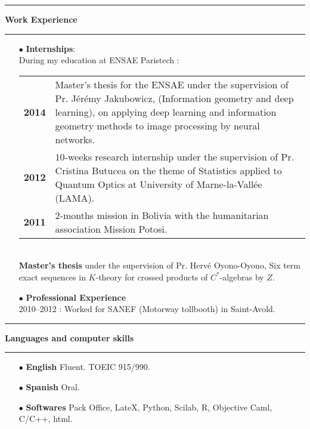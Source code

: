 \documentclass[a4paper,11pt]{article}
\newcommand{\titre}[1]{%
	\begin{center}
	\bigskip
	\rule{\textwidth}{1pt}
	\par\vspace{0.1cm}
        \textbf{\large #1}
	\par\rule{\textwidth}{1pt}
	\end{center}
	\bigskip
	}
\begin{document}
\titre{Work Experience}

\begin{itemize}
\medskip
\item[$\bullet$] \textbf{Internships}: \\

During my education at ENSAE Paristech : \\

\begin{tabular}{cp{}}
\textbf{2014} & Master's thesis for the ENSAE under the supervision of Pr. Jérémy Jakubowicz, (Information geometry and deep learning), on applying deep learning and information geometry methods to image processing by neural networks.\\
\textbf{2012}&  $10$-weeks research internship under the supervision of Pr. Cristina Butucea on the theme of Statistics applied to Quantum Optics at University of Marne-la-Vallée (LAMA).		\\
\textbf{2011} & $2$-months mission in Bolivia with the humanitarian association Mission Potosi.\\
\end{tabular}
\\

\textbf{Master's thesis} under the supervision of Pr. Hervé Oyono-Oyono, Six term exact sequences in $K$-theory for crossed products of $C^*$-algebras by $Z$.

\medskip

\item[$\bullet$] \textbf{Professional Experience}\\ 2010--2012 : Worked for SANEF (Motorway tollbooth) in Saint-Avold.\\

\medskip
\end{itemize}

\newpage

\titre{Languages and computer skills}

\begin{itemize} 
\medskip
\item[$\bullet$] \textbf{English} Fluent. TOEIC 915/990.
\medskip
\item[$\bullet$] \textbf{Spanish} Oral.
\medskip
\item[$\bullet$] \textbf{Softwares} Pack Office, LateX, Python, Scilab, R, Objective Caml, C/C++, html.
\end{itemize}
\end{document}
